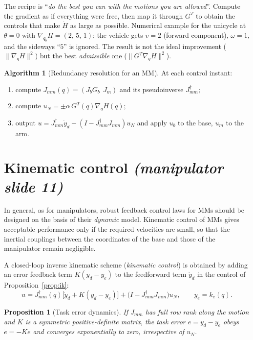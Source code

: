 \documentclass[11pt,a4paper]{article}
\def\bm#1{#1}%
\newcommand{\qbase}{\bm{q}_b}
\newcommand{\ubase}{\bm{u}_b}
\newcommand{\uarm}{\bm{u}_m}
\newcommand{\Gbase}{\bm{G}_b}
\newcommand{\Jbase}{\bm{J}_b}
\newcommand{\Jarm}{\bm{J}_m}
\newcommand{\Jmm}{\bm{J}_{mm}}
\newcommand{\ye}{\bm{y}_e}
\newcommand{\grad}{\nabla_{\!\bm{q}}}
\theoremstyle{definition}
\newtheorem{algorithm}[definition]{Algorithm}
\theoremstyle{plain}
\newtheorem{proposition}[definition]{Proposition}
\theoremstyle{remark}
\begin{document}
\begin{intuition}
The recipe is ``\emph{do the best you can with the motions you are allowed}''. Compute the gradient as if everything were free, then map it through $\bm G^T$ to obtain the controls that make $\dot H$ as large as possible. Numerical example for the unicycle at $\theta=0$ with $\nabla_{\qbase}H=(2,\,5,\,1)$: the vehicle gets $v=2$ (forward component), $\omega=1$, and the sideways ``$5$'' is ignored. The result is not the ideal improvement ($\|\grad H\|^2$) but the best \emph{admissible} one ($\|\bm G^T\grad H\|^2$).
\end{intuition}

\begin{algorithm}[Redundancy resolution for an MM]\label{alg:ik}
At each control instant:
\begin{enumerate}[leftmargin=*,nosep]
\item compute $\Jmm(\bm q)=(\Jbase\Gbase\ \ \Jarm)$ and its pseudoinverse $\Jmm^\dagger$;
\item compute $\bm u_N=\pm\alpha\,\bm G^T(\bm q)\grad H(\bm q)$;
\item output $\bm u=\Jmm^\dagger\dot{\bm y}_d+(\bm I-\Jmm^\dagger\Jmm)\bm u_N$ and apply $\ubase$ to the base, $\uarm$ to the arm.
\end{enumerate}
\end{algorithm}

\section{Kinematic control \emph{(manipulator slide 11)}}

In general, as for manipulators, robust feedback control laws for MMs should be designed on the basis of their \emph{dynamic} model. Kinematic control of MMs gives acceptable performance only if the required velocities are small, so that the inertial couplings between the coordinates of the base and those of the manipulator remain negligible.

A closed-loop inverse kinematic scheme (\emph{kinematic control}) is obtained by adding an error feedback term $\bm K(\bm y_d-\bm y_e)$ to the feedforward term $\dot{\bm y}_d$ in the control of Proposition~\ref{prop:ik}:
\[
\bm u=\Jmm^\dagger(\bm q)\bigl[\dot{\bm y}_d+\bm K(\bm y_d-\ye)\bigr]+\bigl(\bm I-\Jmm^\dagger\Jmm\bigr)\bm u_N ,\qquad \ye=\bm k_e(\bm q).
\]

\begin{proposition}[Task error dynamics]\label{prop:err}
If $\Jmm$ has full row rank along the motion and $\bm K$ is a symmetric positive-definite matrix, the task error $\bm e=\bm y_d-\ye$ obeys $\dot{\bm e}=-\bm K\bm e$ and converges exponentially to zero, irrespective of $\bm u_N$.
\end{proposition}
\end{document}
